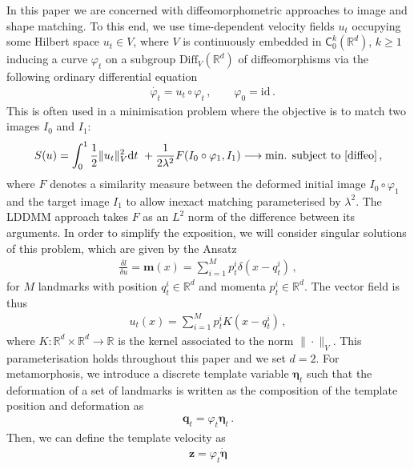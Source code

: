 \documentclass[runningheads]{llncs}
\newcommand{\half}{\frac 12}
\newcommand{\norm}[2]{\| #1 \|_{ #2 }}
\newcommand{\vnorm}[1]{\norm{ #1 }{V}}
\newcommand{\diff}[1]{\text{d} #1}
\newcommand{\Rd}{\mathbb{R}^{d}}
\begin{document}
In this paper we are concerned with diffeomorphometric approaches to image and
shape matching. To this end, we use time-dependent velocity fields $u_t$ occupying
some Hilbert space $u_t \in V$, where $V$ is continuously embedded in
$\textsf{C}_0^k(\Rd)$, $k\geq 1$ inducing a curve $\varphi_t$ on a subgroup
$\text{Diff}_V(\Rd)$ of diffeomorphisms
\cite{arnold1966geometrie,younes2010shapes} via the following ordinary
differential equation
\begin{align}
& \dot{\varphi_t} = u_t \circ \varphi_t\, , \qquad  \varphi_0 = \text{id}\, . 
  \label{diffeo}
\end{align}
This is often used in a minimisation problem where the objective is to match two
images $I_0$ and $I_1$:
\begin{align}
  S(u) = \int_0^1 \half\vnorm{u_t}^2 \diff{t} + \frac{1}{2\lambda^2}
  F(I_0\circ\varphi_1, I_1)\longrightarrow \text{min. subject to \eqref{diffeo}}\, , \label{E-def}
\end{align}
where $F$ denotes a similarity measure between the deformed initial image
$I_0\circ \varphi_1$ and the target image $I_1$ to allow inexact matching
parameterised by $\lambda^2$. The LDDMM approach takes $F$ as an $L^2$ norm of
the difference between its arguments. In order to simplify the exposition, we
will consider singular solutions of this problem, which are given by the Ansatz
\begin{align}
  \frac{\delta l}{\delta u} = \mathbf m(x) = \sum_{i=1}^M p_t^i \delta(x-q_t^i)\,, 
\end{align}
for $M$ landmarks with position $q_t^i\in \Rd$ and momenta $p_t^i \in \Rd$.
The vector field is thus 
\begin{align}
  u_t(x) = \sum_{i=1}^M p_t^i K(x-q_t^i)\,, 
  \label{u-def}
\end{align}
where $K:\mathbb R^d\times \mathbb R^d\to \mathbb R$ is the kernel associated to
the norm $\|\cdot \|_V$. This parameterisation holds throughout this paper and
we set $d=2$. For metamorphosis, we introduce a discrete template variable
$\boldsymbol \eta_t$ such that the deformation of a set of landmarks is written
as the composition of the template position and deformation as
\begin{align}
  \mathbf q_t = \varphi_t \boldsymbol \eta_t\, . 
  \label{q_t}
\end{align}
Then, we can define the template velocity as 
\begin{align}
  \mathbf z = \varphi_t \dot {\boldsymbol \eta}
  \label{z_eta}
\end{align}
\end{document}
